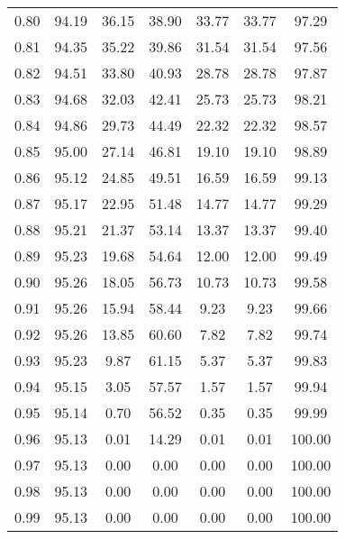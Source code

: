 \begin{tabular}{|c|c|c|c|c|c|c|}
      0.80 &     94.19 &     36.15 &      38.90 &   33.77 &      33.77 &         97.29 \\
      0.81 &     94.35 &     35.22 &      39.86 &   31.54 &      31.54 &         97.56 \\
      0.82 &     94.51 &     33.80 &      40.93 &   28.78 &      28.78 &         97.87 \\
      0.83 &     94.68 &     32.03 &      42.41 &   25.73 &      25.73 &         98.21 \\
      0.84 &     94.86 &     29.73 &      44.49 &   22.32 &      22.32 &         98.57 \\
      0.85 &     95.00 &     27.14 &      46.81 &   19.10 &      19.10 &         98.89 \\
      0.86 &     95.12 &     24.85 &      49.51 &   16.59 &      16.59 &         99.13 \\
      0.87 &     95.17 &     22.95 &      51.48 &   14.77 &      14.77 &         99.29 \\
      0.88 &     95.21 &     21.37 &      53.14 &   13.37 &      13.37 &         99.40 \\
      0.89 &     95.23 &     19.68 &      54.64 &   12.00 &      12.00 &         99.49 \\
      0.90 &     95.26 &     18.05 &      56.73 &   10.73 &      10.73 &         99.58 \\
      0.91 &     95.26 &     15.94 &      58.44 &    9.23 &       9.23 &         99.66 \\
      0.92 &     95.26 &     13.85 &      60.60 &    7.82 &       7.82 &         99.74 \\
      0.93 &     95.23 &      9.87 &      61.15 &    5.37 &       5.37 &         99.83 \\
      0.94 &     95.15 &      3.05 &      57.57 &    1.57 &       1.57 &         99.94 \\
      0.95 &     95.14 &      0.70 &      56.52 &    0.35 &       0.35 &         99.99 \\
      0.96 &     95.13 &      0.01 &      14.29 &    0.01 &       0.01 &        100.00 \\
      0.97 &     95.13 &      0.00 &       0.00 &    0.00 &       0.00 &        100.00 \\
      0.98 &     95.13 &      0.00 &       0.00 &    0.00 &       0.00 &        100.00 \\
      0.99 &     95.13 &      0.00 &       0.00 &    0.00 &       0.00 &        100.00 \\
\bottomrule
\end{tabular}
